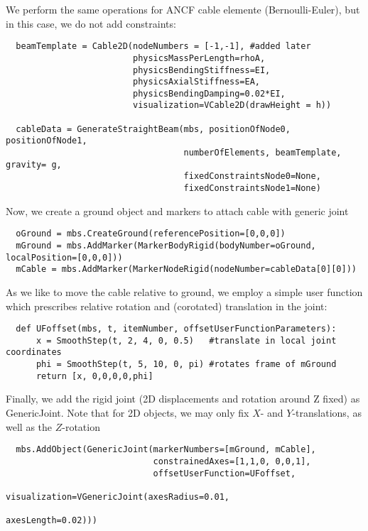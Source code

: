 \noindent We perform the same operations for ANCF cable elemente (Bernoulli-Euler),
but in this case, we do not add constraints:
\pythonstyle\begin{lstlisting}
  beamTemplate = Cable2D(nodeNumbers = [-1,-1], #added later
                         physicsMassPerLength=rhoA,
                         physicsBendingStiffness=EI,
                         physicsAxialStiffness=EA,
                         physicsBendingDamping=0.02*EI,
                         visualization=VCable2D(drawHeight = h))

  cableData = GenerateStraightBeam(mbs, positionOfNode0, positionOfNode1, 
                                   numberOfElements, beamTemplate, gravity= g, 
                                   fixedConstraintsNode0=None, 
                                   fixedConstraintsNode1=None)
\end{lstlisting}

\noindent Now, we create a ground object and markers to attach cable with generic joint
\pythonstyle\begin{lstlisting}
  oGround = mbs.CreateGround(referencePosition=[0,0,0])
  mGround = mbs.AddMarker(MarkerBodyRigid(bodyNumber=oGround, localPosition=[0,0,0]))
  mCable = mbs.AddMarker(MarkerNodeRigid(nodeNumber=cableData[0][0]))
\end{lstlisting}

\noindent As we like to move the cable relative to ground, we employ a simple 
user function which prescribes relative rotation and (corotated) translation in the joint:
\pythonstyle\begin{lstlisting}
  def UFoffset(mbs, t, itemNumber, offsetUserFunctionParameters):
      x = SmoothStep(t, 2, 4, 0, 0.5)   #translate in local joint coordinates
      phi = SmoothStep(t, 5, 10, 0, pi) #rotates frame of mGround
      return [x, 0,0,0,0,phi]

\end{lstlisting}

\noindent Finally, we add the rigid joint (2D displacements and rotation around Z fixed) as GenericJoint.
Note that for 2D objects, we may only fix $X$- and $Y$-translations, as well as the $Z$-rotation
\pythonstyle\begin{lstlisting}
  mbs.AddObject(GenericJoint(markerNumbers=[mGround, mCable],
                             constrainedAxes=[1,1,0, 0,0,1],
                             offsetUserFunction=UFoffset,
                             visualization=VGenericJoint(axesRadius=0.01,
                                                         axesLength=0.02)))
\end{lstlisting}

